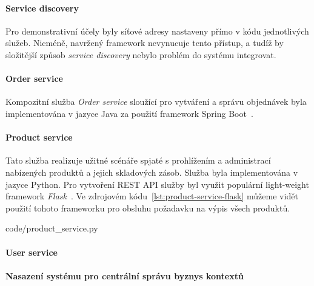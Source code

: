 \paragraph{Service discovery}

Pro demonstrativní účely byly síťové adresy nastaveny přímo v kódu jednotlivých
služeb. Nicméně, navržený framework nevynucuje tento přístup, a tudíž by složitější
způsob \textit{service discovery} nebylo problém do systému integrovat.

\paragraph{Order service}

Kompozitní služba \textit{Order service} sloužící pro vytváření a správu objednávek
byla implementována v jazyce Java za použití framework Spring Boot~\cite{springboot}.


\paragraph{Product service}

Tato služba realizuje užitné scénáře spjaté s prohlížením a administrací nabízených
produktů a jejich skladových zásob. Služba byla implementována v jazyce Python.
Pro vytvoření REST API služby byl využit populární light-weight framework \textit{Flask}~\cite{flask}.
Ve zdrojovém kódu~\ref{lst:product-service-flask} můžeme vidět použití tohoto frameworku pro obsluhu
požadavku na výpis všech produktů.



{code/product_service.py}

\paragraph{User service}


\paragraph{Nasazení systému pro centrální správu byznys kontextů}


